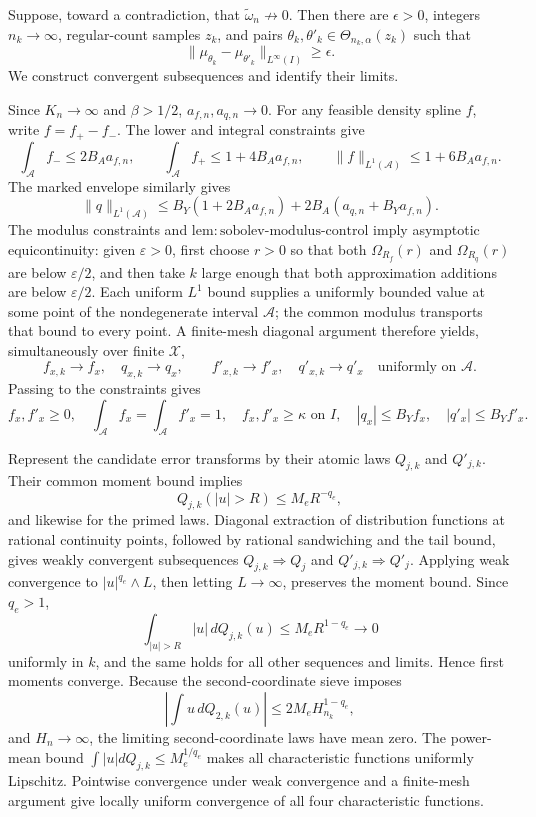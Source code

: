 Suppose, toward a contradiction, that \(\widetilde\omega_n\not\to0\). Then there are \(\epsilon>0\), integers \(n_k\to\infty\), regular-count samples \(z_k\), and pairs \(\theta_k,\theta'_k\in\Theta_{n_k,\alpha}(z_k)\) such that
\[
 \|\mu_{\theta_k}-\mu_{\theta'_k}\|_{L^\infty(I)}\ge\epsilon.
\]
We construct convergent subsequences and identify their limits.

Since \(K_n\to\infty\) and \(\beta>1/2\), \(a_{f,n},a_{q,n}\to0\). For any feasible density spline \(f\), write \(f=f_+-f_-\). The lower and integral constraints give
\[
 \int_{\mathcal A}f_-\le2B_Aa_{f,n},
 \qquad
 \int_{\mathcal A}f_+\le1+4B_Aa_{f,n},
 \qquad
 \|f\|_{L^1(\mathcal A)}\le1+6B_Aa_{f,n}.
\]
The marked envelope similarly gives
\[
 \|q\|_{L^1(\mathcal A)}
 \le B_Y(1+2B_Aa_{f,n})+2B_A(a_{q,n}+B_Ya_{f,n}).
\]
The modulus constraints and \(\mathrm{lem{:}sobolev\text{-}modulus\text{-}control}\) imply asymptotic equicontinuity: given \(\varepsilon>0\), first choose \(r>0\) so that both \(\Omega_{R_f}(r)\) and \(\Omega_{R_q}(r)\) are below \(\varepsilon/2\), and then take \(k\) large enough that both approximation additions are below \(\varepsilon/2\). Each uniform \(L^1\) bound supplies a uniformly bounded value at some point of the nondegenerate interval \(\mathcal A\); the common modulus transports that bound to every point. A finite-mesh diagonal argument therefore yields, simultaneously over finite \(\mathcal X\),
\[
 f_{x,k}\to f_x,\quad q_{x,k}\to q_x,
 \qquad
 f'_{x,k}\to f'_x,\quad q'_{x,k}\to q'_x
 \quad\text{uniformly on }\mathcal A.
\]
Passing to the constraints gives
\[
 f_x,f'_x\ge0,\quad \int_{\mathcal A}f_x=\int_{\mathcal A}f'_x=1,
 \quad f_x,f'_x\ge\kappa\text{ on }I,
 \quad |q_x|\le B_Yf_x,\quad |q'_x|\le B_Yf'_x.
\]

Represent the candidate error transforms by their atomic laws \(Q_{j,k}\) and \(Q'_{j,k}\). Their common moment bound implies
\[
 Q_{j,k}(|u|>R)\le M_eR^{-q_e},
\]
and likewise for the primed laws. Diagonal extraction of distribution functions at rational continuity points, followed by rational sandwiching and the tail bound, gives weakly convergent subsequences \(Q_{j,k}\Rightarrow Q_j\) and \(Q'_{j,k}\Rightarrow Q'_j\). Applying weak convergence to \(|u|^{q_e}\wedge L\), then letting \(L\to\infty\), preserves the moment bound. Since \(q_e>1\),
\[
 \int_{|u|>R}|u|\,dQ_{j,k}(u)\le M_eR^{1-q_e}\longrightarrow0
\]
uniformly in \(k\), and the same holds for all other sequences and limits. Hence first moments converge. Because the second-coordinate sieve imposes
\[
 \left|\int u\,dQ_{2,k}(u)\right|\le2M_eH_{n_k}^{1-q_e},
\]
and \(H_n\to\infty\), the limiting second-coordinate laws have mean zero. The power-mean bound \(\int|u|dQ_{j,k}\le M_e^{1/q_e}\) makes all characteristic functions uniformly Lipschitz. Pointwise convergence under weak convergence and a finite-mesh argument give locally uniform convergence of all four characteristic functions.

